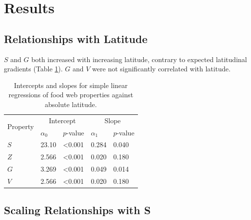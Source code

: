 \documentclass[12pt]{article}
\begin{document}
\section*{Results}

\subsection*{Relationships with Latitude}

$S$ and $G$ both increased with increasing latitude, contrary to expected latitudinal gradients (Table \ref{Latlms}). 
$G$ and $V$ were not significantly correlated with latitude. 

\begin{table}[!h]
\caption{Intercepts and slopes for simple linear regressions of food web properties against absolute latitude.}
\label{Latlms}
\begin{tabular}{l | l l | l l}

\multirow{2}{*}{Property} & \multicolumn{2}{|c}{Intercept} & \multicolumn{2}{|c}{Slope} \\
                      & $\alpha_{0}$ & $p$-value & $\alpha_{1}$ & $p$-value \\
\hline
$S$ & 23.10 & \textless0.001 & 0.284 & 0.040 \\
$Z$ & 2.566 & \textless0.001 & 0.020 & 0.180 \\
$G$ & 3.269 & \textless0.001 & 0.049 & 0.014 \\
$V$ & 2.566 & \textless0.001 & 0.020 & 0.180 \\
\end{tabular}
\end{table}


\subsection*{Scaling Relationships with S}



\end{document}
